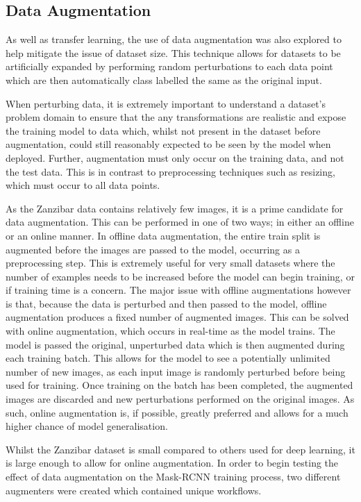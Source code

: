 \subsection{Data Augmentation}\label{ch:cetDet,sec:initialTesting,sub:dataaugmentation}

As well as transfer learning, the use of data augmentation was also explored to help mitigate the issue of dataset size. This technique allows for datasets to be artificially expanded by performing random perturbations to each data point which are then automatically class labelled the same as the original input. 

When perturbing data, it is extremely important to understand a dataset's problem domain to ensure that the any transformations are realistic and expose the training model to data which, whilst not present in the dataset before augmentation, could still reasonably expected to be seen by the model when deployed. Further, augmentation must only occur on the training data, and not the test data. This is in contrast to preprocessing techniques such as resizing, which must occur to all data points. 

As the Zanzibar data contains relatively few images, it is a prime candidate for data augmentation. This can be performed in one of two ways; in either an offline or an online manner. In offline data augmentation, the entire train split is augmented before the images are passed to the model, occurring as a preprocessing step. This is extremely useful for very small datasets where the number of examples needs to be increased before the model can begin training, or if training time is a concern. The major issue with offline augmentations however is that, because the data is perturbed and then passed to the model, offline augmentation produces a fixed number of augmented images. This can be solved with online augmentation, which occurs in real-time as the model trains. The model is passed the original, unperturbed data which is then augmented during each training batch. This allows for the model to see a potentially unlimited number of new images, as each input image is randomly perturbed before being used for training. Once training on the batch has been completed, the augmented images are discarded and new perturbations performed on the original images. As such, online augmentation is, if possible, greatly preferred and allows for a much higher chance of model generalisation. 

Whilst the Zanzibar dataset is small compared to others used for deep learning, it is large enough to allow for online augmentation. In order to begin testing the effect of data augmentation on the Mask-RCNN training process, two different augmenters were created which contained unique workflows. 


